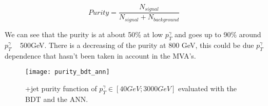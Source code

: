 \begin{equation}
Purity = \frac{N_{signal}}{N_{signal}+N_{background}}
\end{equation}

We can see that the purity is at about 50\% at low $p_T^\gamma$ and goes up to 90\% around $p_T^\gamma$ ~ 500GeV. There
is a decreasing of the purity at 800 GeV, this could be due $p_T^\gamma$ dependence that hasn't been taken in account in the MVA's.

\begin{figure}[h!]
\centering
    \texttt{[image: purity\_bdt\_ann]}
    \caption{\textgamma+jet purity function of $p_T^\gamma \in [ 40 GeV ; 3000 GeV ]$ evaluated with the BDT and the ANN.}
    \label{purity_bdt_ann}
\end{figure}

